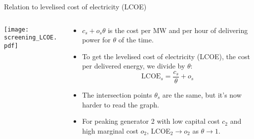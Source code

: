 \documentclass[10pt,aspectratio=169,dvipsnames]{beamer}
\let\olditem\item
\renewcommand{\item}{%
\olditem\vspace{5pt}}
\begin{document}
\begin{frame}{Relation to levelised cost of electricity (LCOE)}

\begin{columns}[T]
  \begin{column}{7cm}
    \texttt{[image: screening\_LCOE.pdf]}
  \end{column}

  \begin{column}{7cm}
    \begin{itemize}
    \item     $c_s + o_s\theta $ is the cost per MW and per hour of delivering power for $\theta$ of the time.
    \item To get the \alert{levelised cost of electricity (LCOE)}, the cost per delivered energy, we divide by $\theta$:
      \begin{equation*}
        \textrm{LCOE}_s = \frac{c_s}{\theta} + o_s
      \end{equation*}
    \item The intersection points $\theta_s$ are the same, but it's now harder to read the graph.
      \item For peaking generator 2 with low capital cost $c_2$ and high marginal cost $o_2$, LCOE$_2\to o_2$ as $\theta \to 1$.
    \end{itemize}
  \end{column}
\end{columns}
\end{frame}
\end{document}
